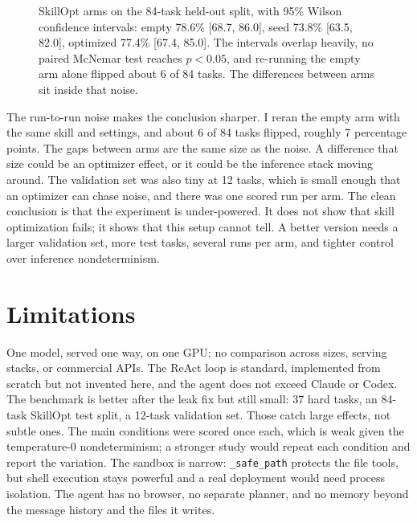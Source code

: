 \documentclass[11pt]{article}
\newcommand{\code}[1]{\texttt{\small #1}}
\begin{document}
\begin{figure}[h]
\centering
{}
\caption{SkillOpt arms on the 84-task held-out split, with 95\% Wilson confidence intervals: empty 78.6\%
[68.7, 86.0], seed 73.8\% [63.5, 82.0], optimized 77.4\% [67.4, 85.0]. The intervals overlap heavily, no
paired McNemar test reaches $p<0.05$, and re-running the empty arm alone flipped about 6 of 84 tasks. The
differences between arms sit inside that noise.}
\label{fig:skillopt}
\end{figure}

The run-to-run noise makes the conclusion sharper. I reran the empty arm with the same skill and settings,
and about 6 of 84 tasks flipped, roughly 7 percentage points. The gaps between arms are the same size as
the noise. A difference that size could be an optimizer effect, or it could be the inference stack moving
around. The validation set was also tiny at 12 tasks, which is small enough that an optimizer can chase
noise, and there was one scored run per arm. The clean conclusion is that the experiment is under-powered.
It does not show that skill optimization fails; it shows that this setup cannot tell. A better version
needs a larger validation set, more test tasks, several runs per arm, and tighter control over inference
nondeterminism.

\section{Limitations}
One model, served one way, on one GPU; no comparison across sizes, serving stacks, or commercial APIs.
The ReAct loop is standard, implemented from scratch but not invented here, and the agent does not exceed
Claude or Codex. The benchmark is better after the leak fix but still small: 37 hard tasks, an 84-task
SkillOpt test split, a 12-task validation set. Those catch large effects, not subtle ones. The main
conditions were scored once each, which is weak given the temperature-0 nondeterminism; a stronger study
would repeat each condition and report the variation. The sandbox is narrow: \code{\_safe\_path} protects
the file tools, but shell execution stays powerful and a real deployment would need process isolation. The
agent has no browser, no separate planner, and no memory beyond the message history and the files it
writes.
\end{document}
